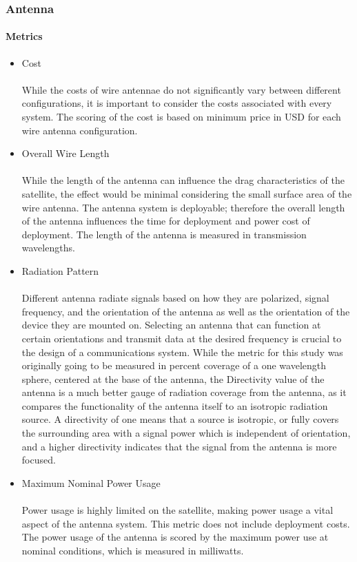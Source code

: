 \subsubsection{Antenna}


\paragraph{Metrics}
\begin{itemize}
    \item Cost\\
    \\
    While the costs of wire antennae do not significantly vary between different configurations, it is important to consider the costs associated with every system. The scoring of the cost is based on minimum price in USD for each wire antenna configuration.\\
    \item Overall Wire Length\\
    \\
    While the length of the antenna can influence the drag characteristics of the satellite, the effect would be minimal considering the small surface area of the wire antenna. The antenna system is deployable; therefore the overall length of the antenna influences the time for deployment and power cost of deployment. The length of the antenna is measured in transmission wavelengths.\\
    \item Radiation Pattern \\
    \\
    Different antenna radiate signals based on how they are polarized, signal frequency, and the orientation of the antenna as well as the orientation of the device they are mounted on. Selecting an antenna that can function at certain orientations and transmit data at the desired frequency is crucial to the design of a communications system. While the metric for this study was originally going to be measured in percent coverage of a one wavelength sphere, centered at the base of the antenna, the Directivity value of the antenna is a much better gauge of radiation coverage from the antenna, as it compares the functionality of the antenna itself to an isotropic radiation source. A directivity of one means that a source is isotropic, or fully covers the surrounding area with a signal power which is independent of orientation, and a higher directivity indicates that the signal from the antenna is more focused.\\
    \item Maximum Nominal Power Usage \\
    \\
    Power usage is highly limited on the satellite, making power usage a vital aspect of the antenna system. This metric does not include deployment costs. The power usage of the antenna is scored by the maximum power use at nominal conditions, which is measured in milliwatts.
\end{itemize}




